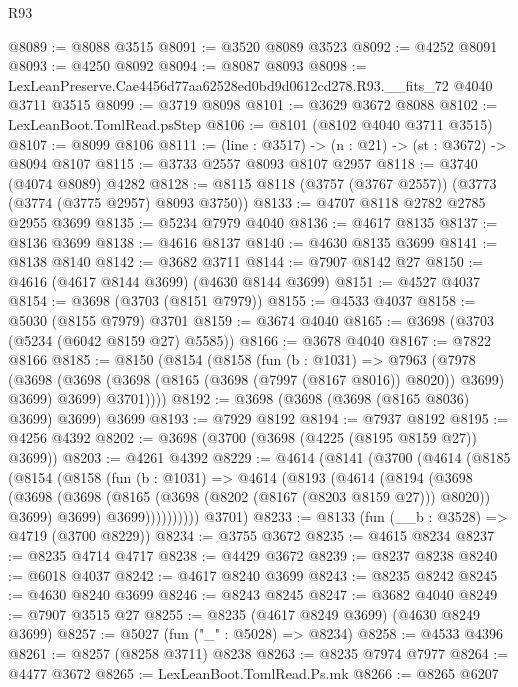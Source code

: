 \begin{lexlean}{R93}
\begin{coremodule}
@8089 := @8088 @3515
@8091 := @3520 @8089 @3523
@8092 := @4252 @8091
@8093 := @4250 @8092
@8094 := @8087 @8093
@8098 := LexLeanPreserve.Cae4456d77aa62528ed0bd9d0612cd278.R93.__fits_72 @4040 @3711 @3515
@8099 := @3719 @8098
@8101 := @3629 @3672 @8088
@8102 := LexLeanBoot.TomlRead.psStep
@8106 := @8101 (@8102 @4040 @3711 @3515)
@8107 := @8099 @8106
@8111 := (line : @3517) -> (n : @21) -> (st : @3672) -> @8094 @8107
@8115 := @3733 @2557 @8093 @8107 @2957
@8118 := @3740 (@4074 @8089) @4282
@8128 := @8115 @8118 (@3757 (@3767 @2557)) (@3773 (@3774 (@3775 @2957) @8093 @3750))
@8133 := @4707 @8118 @2782 @2785 @2955 @3699
@8135 := @5234 @7979 @4040
@8136 := @4617 @8135
@8137 := @8136 @3699
@8138 := @4616 @8137
@8140 := @4630 @8135 @3699
@8141 := @8138 @8140
@8142 := @3682 @3711
@8144 := @7907 @8142 @27
@8150 := @4616 (@4617 @8144 @3699) (@4630 @8144 @3699)
@8151 := @4527 @4037
@8154 := @3698 (@3703 (@8151 @7979))
@8155 := @4533 @4037
@8158 := @5030 (@8155 @7979) @3701
@8159 := @3674 @4040
@8165 := @3698 (@3703 (@5234 (@6042 @8159 @27) @5585))
@8166 := @3678 @4040
@8167 := @7822 @8166
@8185 := @8150
    (@8154
      (@8158
        (fun (b : @1031) =>
        @7963
          (@7978
            (@3698 (@3698 (@3698 (@8165 (@3698 (@7997 (@8167 @8016)) @8020)) @3699) @3699) @3699)
            @3701))))
@8192 := @3698 (@3698 (@3698 (@8165 @8036) @3699) @3699) @3699
@8193 := @7929 @8192
@8194 := @7937 @8192
@8195 := @4256 @4392
@8202 := @3698 (@3700 (@3698 (@4225 (@8195 @8159 @27)) @3699))
@8203 := @4261 @4392
@8229 := @4614
    (@8141
      (@3700
        (@4614
          (@8185
            (@8154
              (@8158
                (fun (b : @1031) =>
                @4614
                  (@8193
                    (@4614
                      (@8194
                        (@3698
                          (@3698
                            (@3698 (@8165 (@3698 (@8202 (@8167 (@8203 @8159 @27))) @8020)) @3699)
                            @3699)
                          @3699))))))))))
      @3701)
@8233 := @8133 (fun (__b : @3528) => @4719 (@3700 @8229))
@8234 := @3755 @3672
@8235 := @4615 @8234
@8237 := @8235 @4714 @4717
@8238 := @4429 @3672
@8239 := @8237 @8238
@8240 := @6018 @4037
@8242 := @4617 @8240 @3699
@8243 := @8235 @8242
@8245 := @4630 @8240 @3699
@8246 := @8243 @8245
@8247 := @3682 @4040
@8249 := @7907 @3515 @27
@8255 := @8235 (@4617 @8249 @3699) (@4630 @8249 @3699)
@8257 := @5027 (fun ("_" : @5028) => @8234)
@8258 := @4533 @4396
@8261 := @8257 (@8258 @3711) @8238
@8263 := @8235 @7974 @7977
@8264 := @4477 @3672
@8265 := LexLeanBoot.TomlRead.Ps.mk
@8266 := @8265 @6207

\end{coremodule}
\end{lexlean}
